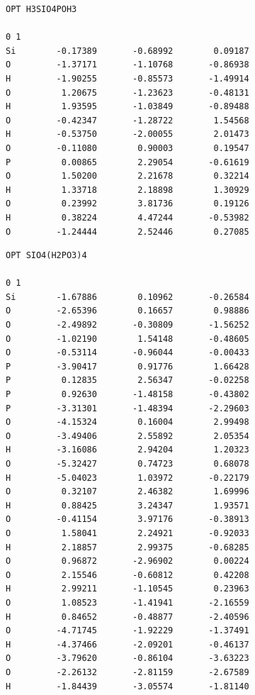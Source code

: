 \documentclass[
  printed, %
  table,   %
  lof,     %
  lot,     %
  oneside,
]{fithesis3}
\begin{document}
\begin{lstlisting}[frame=single, caption={\ce{H3SiO4(H2PO3)}},label=DescriptiveLabel]
OPT H3SIO4POH3

0 1
Si        -0.17389       -0.68992        0.09187
O         -1.37171       -1.10768       -0.86938
H         -1.90255       -0.85573       -1.49914
O          1.20675       -1.23623       -0.48131
H          1.93595       -1.03849       -0.89488
O         -0.42347       -1.28722        1.54568
H         -0.53750       -2.00055        2.01473
O         -0.11080        0.90003        0.19547
P          0.00865        2.29054       -0.61619
O          1.50200        2.21678        0.32214
H          1.33718        2.18898        1.30929
O          0.23992        3.81736        0.19126
H          0.38224        4.47244       -0.53982
O         -1.24444        2.52446        0.27085
 \end{lstlisting}

\newpage

\begin{lstlisting}[frame=single, caption={\ce{SiO4(H2PO3)4}},label=DescriptiveLabel]
OPT SIO4(H2PO3)4

0 1
Si        -1.67886        0.10962       -0.26584
O         -2.65396        0.16657        0.98886
O         -2.49892       -0.30809       -1.56252
O         -1.02190        1.54148       -0.48605
O         -0.53114       -0.96044       -0.00433
P         -3.90417        0.91776        1.66428
P          0.12835        2.56347       -0.02258
P          0.92630       -1.48158       -0.43802
P         -3.31301       -1.48394       -2.29603
O         -4.15324        0.16004        2.99498
O         -3.49406        2.55892        2.05354
H         -3.16086        2.94204        1.20323
O         -5.32427        0.74723        0.68078
H         -5.04023        1.03972       -0.22179
O          0.32107        2.46382        1.69996
H          0.88425        3.24347        1.93571
O         -0.41154        3.97176       -0.38913
O          1.58041        2.24921       -0.92033
H          2.18857        2.99375       -0.68285
O          0.96872       -2.96902        0.00224
O          2.15546       -0.60812        0.42208
H          2.99211       -1.10545        0.23963
O          1.08523       -1.41941       -2.16559
H          0.84652       -0.48877       -2.40596
O         -4.71745       -1.92229       -1.37491
H         -4.37466       -2.09201       -0.46137
O         -3.79620       -0.86104       -3.63223
O         -2.26132       -2.81159       -2.67589
H         -1.84439       -3.05574       -1.81140
 \end{lstlisting}
\newpage
\end{document}
